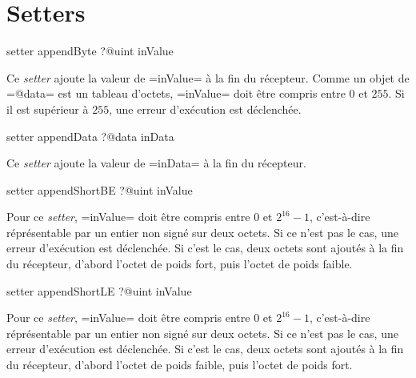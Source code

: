\section{Setters}



\begin{galgas}
setter appendByte ?@uint inValue
\end{galgas}

Ce \emph{setter} ajoute la valeur de \ggs=inValue= à la fin du récepteur. Comme un objet de \ggs=@data= est un tableau d'octets, \ggs=inValue= doit être compris entre $0$ et $255$. Si il est supérieur à $255$, une erreur d'exécution est déclenchée.




\begin{galgas}
setter appendData ?@data inData
\end{galgas}

Ce \emph{setter} ajoute la valeur de \ggs=inData= à la fin du récepteur.






\begin{galgas}
setter appendShortBE ?@uint inValue
\end{galgas}

Pour ce \emph{setter}, \ggs=inValue= doit être compris entre $0$ et $2^{16}-1$, c'est-à-dire réprésentable par un entier non signé sur deux octets. Si ce n'est pas le cas, une erreur d'exécution est déclenchée. Si c'est le cas, deux octets sont ajoutés à la fin du récepteur, d'abord l'octet de poids fort, puis l'octet de poids faible.








\begin{galgas}
setter appendShortLE ?@uint inValue
\end{galgas}

Pour ce \emph{setter}, \ggs=inValue= doit être compris entre $0$ et $2^{16}-1$, c'est-à-dire réprésentable par un entier non signé sur deux octets. Si ce n'est pas le cas, une erreur d'exécution est déclenchée. Si c'est le cas, deux octets sont ajoutés à la fin du récepteur, d'abord l'octet de poids faible, puis l'octet de poids fort.








